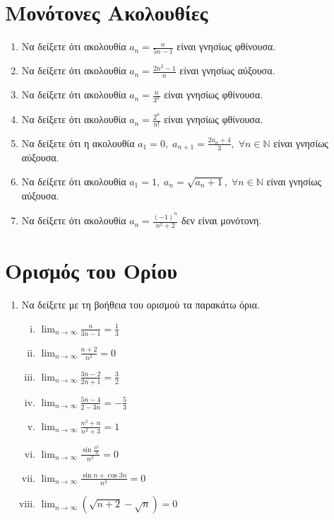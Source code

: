 \documentclass[a4paper,table]{report}
\begin{document}
\section{Μονότονες Ακολουθίες}

\begin{enumerate}
  \item Να δείξετε ότι ακολουθία $ a_{n} = \frac{n}{5n-1} $ είναι 
    γνησίως φθίνουσα.
  \item Να δείξετε ότι ακολουθία $ a_{n} = \frac{2n^{2}-1}{n} $ είναι γνησίως 
    αύξουσα.
  \item Να δείξετε ότι ακολουθία $ a_{n} = \frac{n}{3^{n}} $ είναι 
    γνησίως φθίνουσα.
  \item Να δείξετε ότι ακολουθία $ a_{n} = \frac{2^{n}}{n!} $ είναι 
    γνησίως φθίνουσα.
  \item Να δείξετε ότι η ακολουθία $ a_{1}=0, \; a_{n+1}= 
    \frac{2 a_{n}+4}{3}, \; \forall n \in \mathbb{N} $ είναι γνησίως αύξουσα.
  \item Να δείξετε ότι ακολουθία $ a_{1}=1, \; a_{n} = \sqrt{a_{n}+1}, \; 
    \forall n \in \mathbb{N}$ είναι γνησίως αύξουσα.
  \item Να δείξετε ότι ακολουθία $ a_{n} =  \frac{(-1)^{n}}{n^{2}+2} $ 
    δεν είναι μονότονη. 
\end{enumerate}

\section{Ορισμός του Ορίου}

\begin{enumerate}
  \item Να δείξετε με τη βοήθεια του ορισμού τα παρακάτω όρια.
    \begin{enumerate}[i)]
      \item $ \lim_{n \to \infty} \frac{n}{3n-1} = \frac{1}{3} $
      \item $ \lim_{n \to \infty} \frac{n+2}{n^{2}} = 0 $
      \item $ \lim_{n \to \infty} \frac{3n -2}{2n+1} = \frac{3}{2} $ 
      \item $ \lim_{n \to \infty} \frac{5n-4}{2-3n} = - \frac{5}{3} $ 
      \item $ \lim_{n \to \infty} \frac{n^{2}+n}{n^{2}+3} = 1 $ 
      \item $ \lim_{n \to \infty} \frac{\sin{\frac{n^{3}}{3}}}{n^{3}}=0 $
      \item $ \lim_{n \to \infty} \frac{\sin{n} + \cos{3n}}{n^{2}} = 0 $
      \item $ \lim_{n \to \infty} (\sqrt{n+2} - \sqrt{n}) = 0 $
    \end{enumerate}
\end{enumerate}
\end{document}
